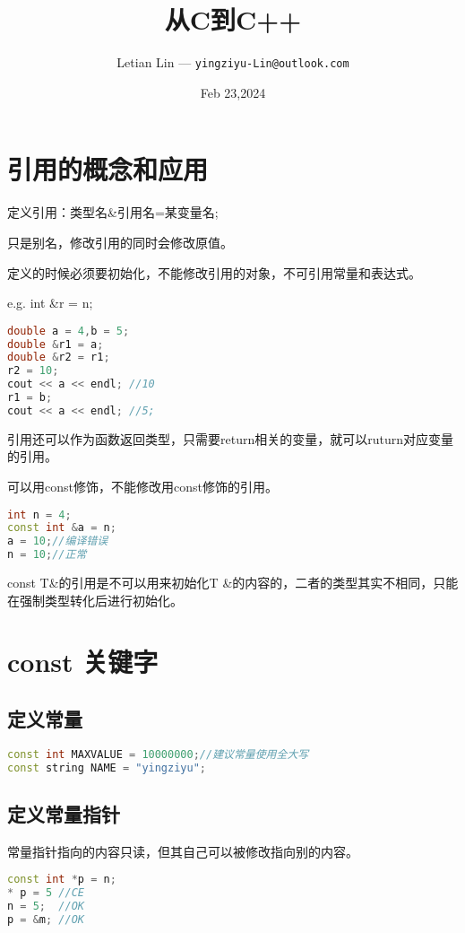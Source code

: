 \documentclass[UTF8]{ctexart}
\title{
	从C到C++
}
\author{
	Letian Lin --- \texttt{yingziyu-Lin@outlook.com}
}
\date{Feb 23,2024}
\begin{document}
\maketitle

\section{引用的概念和应用}
定义引用：类型名\&引用名=某变量名;

只是别名，修改引用的同时会修改原值。

定义的时候必须要初始化，不能修改引用的对象，不可引用常量和表达式。

e.g. int \&r = n;

\begin{lstlisting}[language=C++]
double a = 4,b = 5;
double &r1 = a;
double &r2 = r1;
r2 = 10;
cout << a << endl; //10
r1 = b;
cout << a << endl; //5;
\end{lstlisting}

引用还可以作为函数返回类型，只需要return相关的变量，就可以ruturn对应变量的引用。

可以用const修饰，不能修改用const修饰的引用。

\begin{lstlisting}[language=c++]
int n = 4;
const int &a = n;
a = 10;//编译错误
n = 10;//正常
\end{lstlisting}

const T\&的引用是不可以用来初始化T \&的内容的，二者的类型其实不相同，只能在强制类型转化后进行初始化。

\section{const 关键字}

\subsection{定义常量}

\begin{lstlisting}[language=C++]
const int MAXVALUE = 10000000;//建议常量使用全大写
const string NAME = "yingziyu";
\end{lstlisting}

\subsection{定义常量指针}
常量指针指向的内容只读，但其自己可以被修改指向别的内容。

\begin{lstlisting}[language=C++]
const int *p = n;
* p = 5 //CE
n = 5;  //OK
p = &m; //OK
\end{lstlisting}
\end{document}
